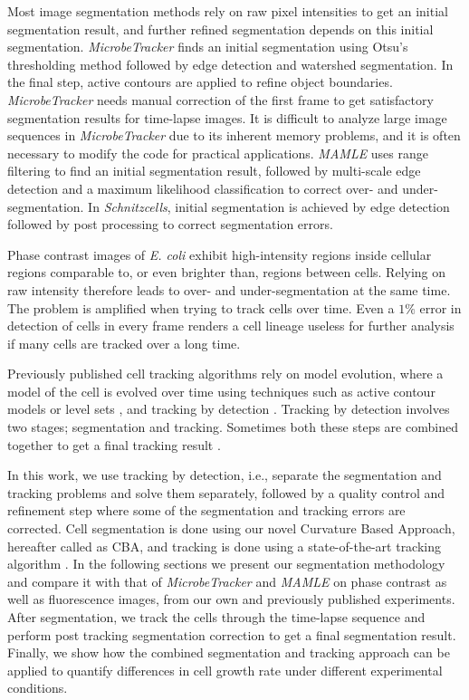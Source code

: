 \documentclass[journal]{IEEEtran}
\begin{document}
Most image segmentation methods rely on raw pixel intensities to get an initial segmentation result, and further refined segmentation depends on this initial segmentation. \textit{MicrobeTracker} finds an initial segmentation using Otsu's thresholding method \cite {otsuthreshold1979} followed by edge detection and watershed segmentation. In the final step, active contours are applied to refine object boundaries. \textit{MicrobeTracker} needs manual correction of the first frame to get satisfactory segmentation results for time-lapse images. It is difficult to analyze large image sequences in \textit{MicrobeTracker} due to its inherent memory problems, and it is often necessary to modify the code for practical applications. \textit{MAMLE} uses range filtering to find an initial segmentation result, followed by multi-scale edge detection and a maximum likelihood classification to correct over- and under- segmentation. In \textit{Schnitzcells}, initial segmentation is achieved by edge detection followed by post processing to correct segmentation errors. 

Phase contrast images of \textit{E. coli} exhibit high-intensity regions inside cellular regions comparable to, or even brighter than, regions between cells. Relying on raw intensity therefore leads to over- and under-segmentation at the same time. The problem is amplified when trying to track cells over time. Even a $1\%$ error in detection of cells in every frame renders a cell lineage useless for further analysis if many cells are tracked over a long time.

Previously published cell tracking algorithms rely on model evolution, where a model of the cell is evolved over time using techniques such as active contour models \cite {zimmersegmentation2002} or level sets \cite {dzyubachykadvanced2010}, and tracking by detection \cite {bisereliable2011}. Tracking by detection involves two stages; segmentation and tracking. Sometimes both these steps are combined together to get a final tracking result \cite {jugoptimal2014}. 

In this work, we use tracking by detection, i.e., separate the segmentation and tracking problems and solve them separately, followed by a quality control and refinement step where some of the segmentation and tracking errors are corrected. Cell segmentation is done using our novel Curvature Based Approach, hereafter called as CBA, and tracking is done using a state-of-the-art tracking algorithm \cite {magnussonglobal2014}. In the following sections we present our segmentation methodology and compare it with that of \textit{MicrobeTracker} and \textit{MAMLE} on phase contrast as well as fluorescence images, from our own and previously published experiments. After segmentation, we track the cells through the time-lapse sequence and perform post tracking segmentation correction to get a final segmentation result. Finally, we show how the combined segmentation and tracking approach can be applied to quantify differences in cell growth rate under different experimental conditions.
\end{document}
